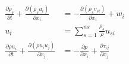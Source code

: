 \documentclass[12pt,preview, border=2mm]{standalone}
\begin{document}
\begin{align*}
    \frac{\partial\rho_s}{\partial t} + \frac{\partial(\rho_su_i)}{\partial x_i}      & = -\frac{\partial(\rho_sv_{si})}{\partial x_i} + w_i                         \\
    u_i                                                                               & = \sum^{ns}_{s=1}\frac{\rho_s}{\rho}u_{si}                                   \\
    \frac{\partial\rho u_i}{\partial t} + \frac{\partial(\rho u_i u_j)}{\partial x_j} & = -\frac{\partial p}{\partial x_i} + \frac{\partial \tau_{ij}}{\partial x_j}
\end{align*}
\end{document}
